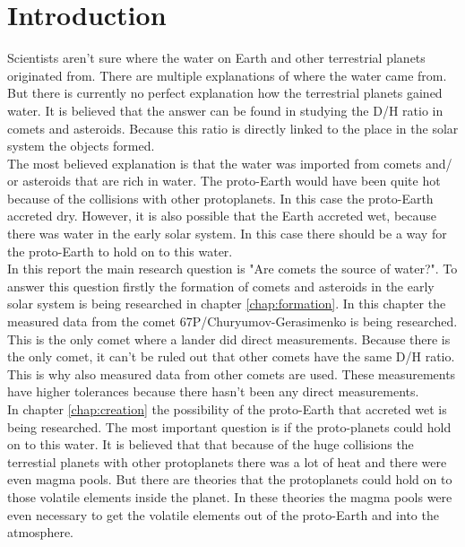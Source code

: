 
\section{Introduction}
Scientists aren't sure where the water on Earth and other terrestrial planets originated from. There are multiple explanations of where the water came from. But there is currently no perfect explanation how the terrestrial planets gained water. It is believed that the answer can be found in studying the D/H ratio in comets and asteroids. Because this ratio is directly linked to the place in the solar system the objects formed.\\

The most believed explanation is that the water was imported from comets and/ or asteroids that are rich in water. The proto-Earth would have been quite hot because of the collisions with other protoplanets. In this case the proto-Earth accreted dry. However, it is also possible that the Earth accreted wet, because there was water in the early solar system. In this case there should be a way for the proto-Earth to hold on to this water.\\

In this report the main research question is "Are comets the source of water?". To answer this question firstly the formation of comets and asteroids in the early solar system is being researched in chapter \ref{chap:formation}. In this chapter the measured data from the comet 67P/Churyumov-Gerasimenko is being researched. This is the only comet where a lander did direct measurements. Because there is the only comet, it can't be ruled out that other comets have the same D/H ratio. This is why also measured data from other comets are used. These measurements have higher tolerances because there hasn't been any direct measurements.\\

In chapter \ref{chap:creation} the possibility of the proto-Earth that accreted wet is being researched. The most important question is if the proto-planets could hold on to this water. It is believed that that because of the huge collisions the terrestial planets with other protoplanets there was a lot of heat and there were even magma pools. But there are theories that the protoplanets could hold on to those volatile elements inside the planet. In these theories the magma pools were even necessary to get the volatile elements out of the proto-Earth and into the atmosphere. \\

